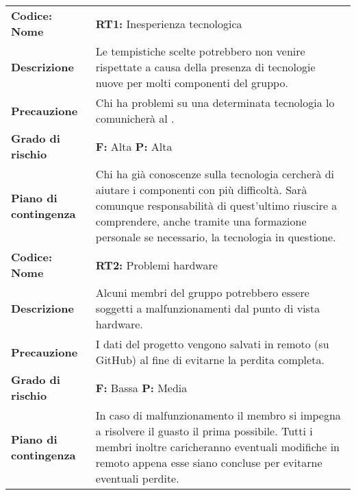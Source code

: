 \setcounter{table}{-1}
{


\centering
\renewcommand{\arraystretch}{1.5}
\begin{longtable}{C{3.5cm} | C{11cm}}
\textbf{Codice: Nome} & \textbf{RT1: }{Inesperienza tecnologica}\\
\textbf{Descrizione} & Le tempistiche scelte potrebbero non venire rispettate a causa della presenza di tecnologie nuove per molti componenti del gruppo.\\ 
\textbf{Precauzione} & Chi ha problemi su una determinata tecnologia lo comunicherà al \respProg{}.\\
\textbf{Grado di rischio} & \textbf{F: }  Alta \textbf{P: } Alta\\   
\textbf{Piano di contingenza} & Chi ha già conoscenze sulla tecnologia cercherà di aiutare i componenti con più difficoltà. Sarà comunque responsabilità di quest'ultimo riuscire a comprendere, anche tramite una formazione personale se necessario, la tecnologia in questione.\\
\hline

\textbf{Codice: Nome} & \textbf{RT2: }{Problemi hardware}\\
\textbf{Descrizione} & Alcuni membri del gruppo potrebbero essere soggetti a malfunzionamenti dal punto di vista hardware.\\ 
\textbf{Precauzione} & I dati del progetto vengono salvati in remoto (su GitHub) al fine di evitarne la perdita completa.\\
\textbf{Grado di rischio} & \textbf{F: }Bassa \textbf{P: }Media\\ 
\textbf{Piano di contingenza} & In caso di malfunzionamento il membro si impegna a risolvere il guasto il prima possibile. Tutti i membri inoltre caricheranno eventuali modifiche in remoto appena esse siano concluse per evitarne eventuali perdite.\\
\hline


\end{longtable}}

